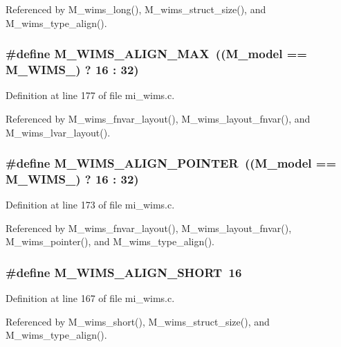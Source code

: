 Referenced by M\_\-wims\_\-long(), M\_\-wims\_\-struct\_\-size(), and M\_\-wims\_\-type\_\-align().
\subsubsection{\setlength{\rightskip}{0pt plus 5cm}\#define M\_\-WIMS\_\-ALIGN\_\-MAX~((\bf{M\_\-model} == M\_\-WIMS\_) ? 16 : 32)}\label{mi__wims_8c_32a038ae160b76c2d742ef24aea77564}




Definition at line 177 of file mi\_\-wims.c.

Referenced by M\_\-wims\_\-fnvar\_\-layout(), M\_\-wims\_\-layout\_\-fnvar(), and M\_\-wims\_\-lvar\_\-layout().
\subsubsection{\setlength{\rightskip}{0pt plus 5cm}\#define M\_\-WIMS\_\-ALIGN\_\-POINTER~((\bf{M\_\-model} == M\_\-WIMS\_) ? 16 : 32)}\label{mi__wims_8c_34e157683ee317daca943e0f1e3569c6}




Definition at line 173 of file mi\_\-wims.c.

Referenced by M\_\-wims\_\-fnvar\_\-layout(), M\_\-wims\_\-layout\_\-fnvar(), M\_\-wims\_\-pointer(), and M\_\-wims\_\-type\_\-align().
\subsubsection{\setlength{\rightskip}{0pt plus 5cm}\#define M\_\-WIMS\_\-ALIGN\_\-SHORT~16}\label{mi__wims_8c_9d0f96c41726956269fefabd7d200e6e}




Definition at line 167 of file mi\_\-wims.c.

Referenced by M\_\-wims\_\-short(), M\_\-wims\_\-struct\_\-size(), and M\_\-wims\_\-type\_\-align().

